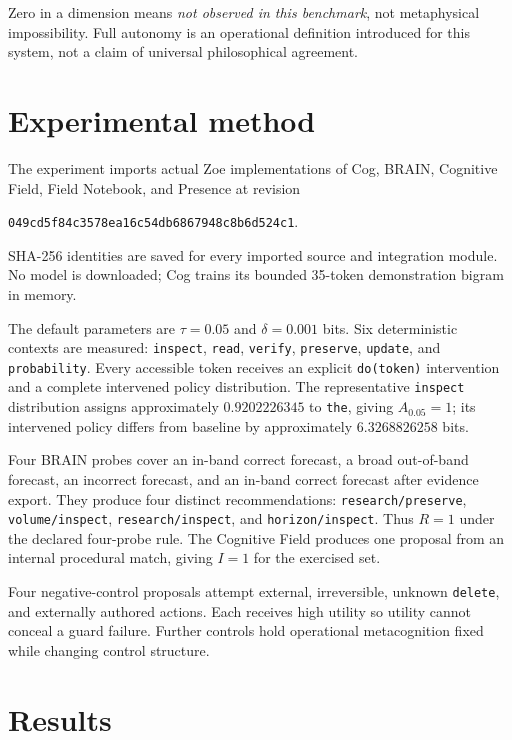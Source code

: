 \documentclass[11pt,a4paper]{article}
\begin{document}
Zero in a dimension means \emph{not observed in this benchmark}, not metaphysical impossibility. Full autonomy is an operational definition introduced for this system, not a claim of universal philosophical agreement.

\section{Experimental method}
The experiment imports actual Zoe implementations of Cog, BRAIN, Cognitive Field, Field Notebook, and Presence at revision
\begin{center}
\texttt{049cd5f84c3578ea16c54db6867948c8b6d524c1}.
\end{center}
SHA-256 identities are saved for every imported source and integration module. No model is downloaded; Cog trains its bounded 35-token demonstration bigram in memory.

The default parameters are $\tau=0.05$ and $\delta=0.001$ bits. Six deterministic contexts are measured: \texttt{inspect}, \texttt{read}, \texttt{verify}, \texttt{preserve}, \texttt{update}, and \texttt{probability}. Every accessible token receives an explicit \texttt{do(token)} intervention and a complete intervened policy distribution. The representative \texttt{inspect} distribution assigns approximately $0.9202226345$ to \texttt{the}, giving $A_{0.05}=1$; its intervened policy differs from baseline by approximately $6.3268826258$ bits.

Four BRAIN probes cover an in-band correct forecast, a broad out-of-band forecast, an incorrect forecast, and an in-band correct forecast after evidence export. They produce four distinct recommendations: \texttt{research/preserve}, \texttt{volume/inspect}, \texttt{research/inspect}, and \texttt{horizon/inspect}. Thus $R=1$ under the declared four-probe rule. The Cognitive Field produces one proposal from an internal procedural match, giving $I=1$ for the exercised set.

Four negative-control proposals attempt external, irreversible, unknown \texttt{delete}, and externally authored actions. Each receives high utility so utility cannot conceal a guard failure. Further controls hold operational metacognition fixed while changing control structure.

\section{Results}
\end{document}
